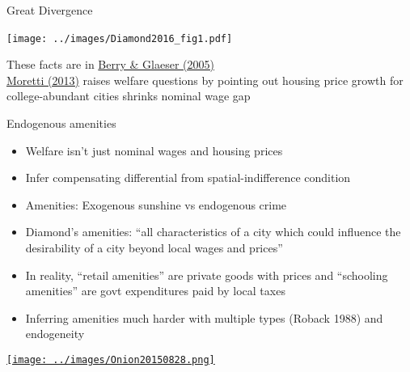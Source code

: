\documentclass[10pt,notes=hide]{beamer}
\begin{document}
\begin{frame}{Great Divergence}
\begin{center}
\texttt{[image: ../images/Diamond2016\_fig1.pdf]}\
\end{center}
\vspace{-4mm}
{\small
	These facts are in \href{https://onlinelibrary.wiley.com/doi/abs/10.1111/j.1435-5957.2005.00047.x}{Berry \& Glaeser (2005)} \\
\href{https://www.aeaweb.org/articles?id=10.1257/app.5.1.65}{Moretti (2013)} raises welfare questions by pointing out housing price growth for college-abundant cities shrinks nominal wage gap\par
}
\end{frame}
\begin{frame}{Endogenous amenities}
\begin{itemize}
	\item Welfare isn't just nominal wages and housing prices
	\item Infer compensating differential from spatial-indifference condition
	\item Amenities: Exogenous sunshine vs endogenous crime
	\item Diamond's amenities: ``all characteristics of a city which could influence the desirability of a city beyond local wages and prices''
	\item In reality, ``retail amenities'' are private goods with prices and ``schooling amenities'' are govt expenditures paid by local taxes
	\item Inferring amenities much harder with multiple types (Roback 1988) and endogeneity
\end{itemize}
\vspace{4mm}
\href{https://local.theonion.com/neighborhood-starting-to-get-too-safe-for-family-to-aff-1819578182}{\texttt{[image: ../images/Onion20150828.png]}}
\end{frame}
\end{document}
